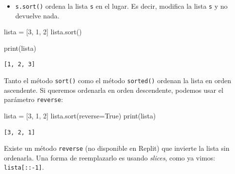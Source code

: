 \documentclass[
  letterpaper,
  DIV=11,
  numbers=noendperiod]{scrreprt}
\newenvironment{Shaded}{\begin{snugshade}}{\end{snugshade}}
\newcommand{\BuiltInTok}[1]{\textcolor[rgb]{0.00,0.23,0.31}{#1}}
\newcommand{\DecValTok}[1]{\textcolor[rgb]{0.68,0.00,0.00}{#1}}
\newcommand{\NormalTok}[1]{\textcolor[rgb]{0.00,0.23,0.31}{#1}}
\newcommand{\OperatorTok}[1]{\textcolor[rgb]{0.37,0.37,0.37}{#1}}
\newcommand{\VariableTok}[1]{\textcolor[rgb]{0.07,0.07,0.07}{#1}}
\providecommand{\tightlist}{%
  \setlength{\itemsep}{0pt}\setlength{\parskip}{0pt}}\usepackage{longtable,booktabs,array}
\begin{document}
\begin{itemize}
\tightlist
\item
  \texttt{s.sort()} ordena la lista \texttt{s} en el lugar. Es decir,
  modifica la lista \texttt{s} y no devuelve nada.
\end{itemize}

\begin{Shaded}
\begin{Highlighting}[]
\NormalTok{lista }\OperatorTok{=}\NormalTok{ [}\DecValTok{3}\NormalTok{, }\DecValTok{1}\NormalTok{, }\DecValTok{2}\NormalTok{]}
\NormalTok{lista.sort()}

\BuiltInTok{print}\NormalTok{(lista)}
\end{Highlighting}
\end{Shaded}

\begin{verbatim}
[1, 2, 3]
\end{verbatim}

Tanto el método \texttt{sort()} como el método \texttt{sorted()} ordenan
la lista en orden ascendente. Si queremos ordenarla en orden
descendente, podemos usar el parámetro \texttt{reverse}:

\begin{Shaded}
\begin{Highlighting}[]
\NormalTok{lista }\OperatorTok{=}\NormalTok{ [}\DecValTok{3}\NormalTok{, }\DecValTok{1}\NormalTok{, }\DecValTok{2}\NormalTok{]}
\NormalTok{lista.sort(reverse}\OperatorTok{=}\VariableTok{True}\NormalTok{)}
\BuiltInTok{print}\NormalTok{(lista)}
\end{Highlighting}
\end{Shaded}

\begin{verbatim}
[3, 2, 1]
\end{verbatim}

Existe un método \texttt{reverse} (no disponible en Replit) que invierte
la lista sin ordenarla. Una forma de reemplazarlo es usando
\emph{slices}, como ya vimos: \texttt{lista{[}::-1{]}}.
\end{document}
